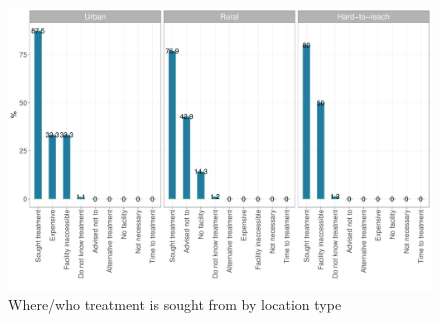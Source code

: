 \documentclass[12pt,a4paper]{article}
\begin{document}
\begin{figure}[H]

{\centering \includegraphics{kayinReport_files/figure-latex/diarrhoea6plot-1} 

}

\caption{Where/who treatment is sought from by location type}\label{fig:diarrhoea6plot}
\end{figure}
\end{document}
